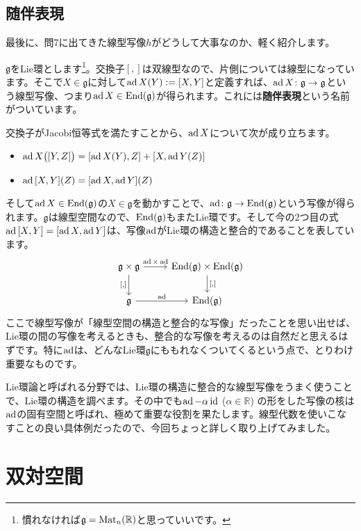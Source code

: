 \subsection{随伴表現}
最後に、問7に出てきた線型写像$h$がどうして大事なのか、軽く紹介します。

$\mathfrak{g}$をLie環とします\footnote{慣れなければ$\mathfrak{g} = \operatorname{Mat}_n(\mathbb{R})$と思っていいです。}。交換子$[, ]$は双線型なので、片側については線型になっています。そこで$X \in \mathfrak{g}$に対して$\operatorname{ad} X(Y) := [X, Y]$と定義すれば、$\operatorname{ad} X \colon \mathfrak{g} \rightarrow \mathfrak{g}$という線型写像、つまり$\operatorname{ad} X \in \operatorname{End}(\mathfrak{g})$が得られます。これには\textbf{随伴表現}という名前がついています。

交換子がJacobi恒等式を満たすことから、$\operatorname{ad} X$について次が成り立ちます。
\begin{itemize}
\item $\operatorname{ad} X\bigl([Y, Z]\bigr) = [\operatorname{ad} X(Y), Z] + [X, \operatorname{ad} Y(Z)]$
\item $\operatorname{ad} {[X, Y]} (Z) = [\operatorname{ad} X, \operatorname{ad} Y] (Z)$
\end{itemize}
そして$\operatorname{ad} X \in \operatorname{End}(\mathfrak{g})$の$X \in \mathfrak{g}$を動かすことで、$\operatorname{ad}\colon \mathfrak{g} \rightarrow \operatorname{End}(\mathfrak{g})$という写像が得られます。$\mathfrak{g}$は線型空間なので、$\operatorname{End}(\mathfrak{g})$もまたLie環です。そして今の$2$つ目の式$\operatorname{ad} {[X, Y]} = [\operatorname{ad} X, \operatorname{ad} Y]$は、写像$\operatorname{ad}$がLie環の構造と整合的であることを表しています。
\[
\begin{tikzcd}
\mathfrak{g} \times \mathfrak{g} \arrow{r}{\ad\times\ad} \arrow{d}[swap]{[,]} & \End(\mathfrak{g}) \times \End(\mathfrak{g}) \arrow{d}{[,]} \\
\mathfrak{g} \arrow{r}{\ad} & \End(\mathfrak{g})
\end{tikzcd}
\]
ここで線型写像が「線型空間の構造と整合的な写像」だったことを思い出せば、Lie環の間の写像を考えるときも、整合的な写像を考えるのは自然だと思えるはずです。特に$\operatorname{ad}$は、どんなLie環$\mathfrak{g}$にももれなくついてくるという点で、とりわけ重要なものです。

Lie環論と呼ばれる分野では、Lie環の構造に整合的な線型写像をうまく使うことで、Lie環の構造を調べます。その中でも$\operatorname{ad} - \alpha \operatorname{id}$ ($\alpha \in \mathbb{R}$) の形をした写像の核は$\operatorname{ad}$の固有空間と呼ばれ、極めて重要な役割を果たします。線型代数を使いこなすことの良い具体例だったので、今回ちょっと詳しく取り上げてみました。

\section{双対空間} \label{section:dual_space}

